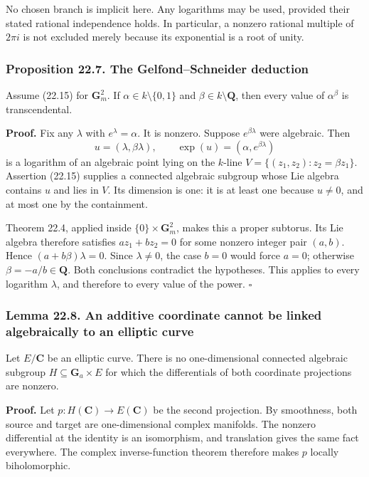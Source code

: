 \documentclass[
  11pt,
  a4paper,
]{article}
\begin{document}
No chosen branch is implicit here. Any logarithms may be used, provided
their stated rational independence holds. In particular, a nonzero
rational multiple of \(2\pi i\) is not excluded merely because its
exponential is a root of unity.

\subsubsection{Proposition 22.7. The Gelfond--Schneider
deduction}\label{proposition-22.7.-the-gelfondschneider-deduction}

Assume (22.15) for \(\mathbf G_m^2\). If \(\alpha\in k\setminus\{0,1\}\)
and \(\beta\in k\setminus\mathbf Q\), then every value of
\(\alpha^\beta\) is transcendental.

\textbf{Proof.} Fix any \(\lambda\) with \(e^\lambda=\alpha\). It is
nonzero. Suppose \(e^{\beta\lambda}\) were algebraic. Then \[
 u=(\lambda,\beta\lambda),\qquad
 \exp(u)=(\alpha,e^{\beta\lambda})
\] is a logarithm of an algebraic point lying on the \(k\)-line
\(V=\{(z_1,z_2):z_2=\beta z_1\}\). Assertion (22.15) supplies a
connected algebraic subgroup whose Lie algebra contains \(u\) and lies
in \(V\). Its dimension is one: it is at least one because \(u\ne0\),
and at most one by the containment.

Theorem 22.4, applied inside \(\{0\}\times\mathbf G_m^2\), makes this a
proper subtorus. Its Lie algebra therefore satisfies \(az_1+bz_2=0\) for
some nonzero integer pair \((a,b)\). Hence \((a+b\beta)\lambda=0\).
Since \(\lambda\ne0\), the case \(b=0\) would force \(a=0\); otherwise
\(\beta=-a/b\in\mathbf Q\). Both conclusions contradict the hypotheses.
This applies to every logarithm \(\lambda\), and therefore to every
value of the power. \(\square\)

\subsubsection{Lemma 22.8. An additive coordinate cannot be linked
algebraically to an elliptic
curve}\label{lemma-22.8.-an-additive-coordinate-cannot-be-linked-algebraically-to-an-elliptic-curve}

Let \(E/\mathbf C\) be an elliptic curve. There is no one-dimensional
connected algebraic subgroup \(H\subseteq\mathbf G_a\times E\) for which
the differentials of both coordinate projections are nonzero.

\textbf{Proof.} Let \(p:H(\mathbf C)\to E(\mathbf C)\) be the second
projection. By smoothness, both source and target are one-dimensional
complex manifolds. The nonzero differential at the identity is an
isomorphism, and translation gives the same fact everywhere. The complex
inverse-function theorem therefore makes \(p\) locally biholomorphic.
\end{document}

